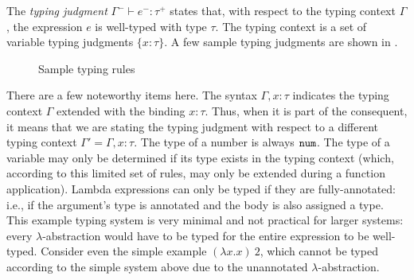The \textit{typing judgment} $\Gamma^-\vdash e^-:\tau^+$ states that, with respect to the typing context $\Gamma$, the expression $e$ is well-typed with type $\tau$. The typing context is a set of variable typing judgments $\{x:\tau\}$. A few sample typing judgments are shown in .

\begin{figure}
  \centering
  \begin{mdframed}
    \begin{singlespace}
    \end{singlespace}
  \end{mdframed}
  \caption{Sample typing rules}
  \label{fig:sample-typing-rules}
\end{figure}

There are a few noteworthy items here. The syntax $\Gamma,x:\tau$ indicates the typing context $\Gamma$ extended with the binding $x:\tau$. Thus, when it is part of the consequent, it means that we are stating the typing judgment with respect to a different typing context $\Gamma'=\Gamma,x:\tau$. The type of a number is always $\mathtt{num}$. The type of a variable may only be determined if its type exists in the typing context (which, according to this limited set of rules, may only be extended during a function application). Lambda expressions can only be typed if they are fully-annotated: i.e., if the argument's type is annotated and the body is also assigned a type. This example typing system is very minimal and not practical for larger systems: every $\lambda$-abstraction would have to be typed for the entire expression to be well-typed. Consider even the simple example $(\lambda x.x)\ 2$, which cannot be typed according to the simple system above due to the unannotated $\lambda$-abstraction.

